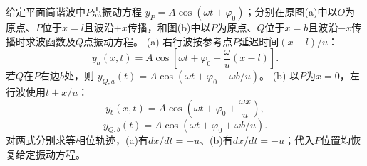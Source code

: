 \problemtext 给定平面简谐波中$P$点振动方程
$y_P=A\cos(\omega t+\varphi_0)$；分别在原图(a)中以$O$为原点、$P$位于$x=l$且波沿$+x$传播，和图(b)中以$P$为原点、$Q$位于$x=b$且波沿$-x$传播时求波函数及$Q$点振动方程。
\workings
(a) 右行波按参考点$P$延迟时间$(x-l)/u$：
\[
\boxed{y_a(x,t)=A\cos\left[\omega t+\varphi_0-\frac{\omega}{u}(x-l)\right]}.
\]
若$Q$在$P$右边$b$处，则
$\boxed{y_{Q,a}(t)=A\cos(\omega t+\varphi_0-\omega b/u)}$。
(b) 以$P$为$x=0$，左行波使用$t+x/u$：
\[
\boxed{y_b(x,t)=A\cos\left(\omega t+\varphi_0+\frac{\omega x}{u}\right)},
\]
\[
\boxed{y_{Q,b}(t)=A\cos(\omega t+\varphi_0+\omega b/u)}.
\]
\crosscheck 对两式分别求等相位轨迹，(a)有$dx/dt=+u$、(b)有$dx/dt=-u$；代入$P$位置均恢复给定振动方程。

